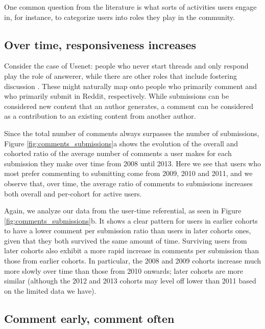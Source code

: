 One common question from the literature is what sorts of activities users engage in, for instance, to categorize users into roles they play in the community\cite{Welser2011}.

\subsection{Over time, responsiveness increases}
Consider the case of Usenet: people who never start threads and only respond play the role of answerer, while there are other roles that include fostering discussion \cite{Welser2007}. These might naturally map onto people who primarily comment and who primarily submit in Reddit, respectively.  While submissions can be considered new content that an author generates, a comment can be considered as a contribution to an existing content from another author.

Since the total number of comments always surpasses the number of submissions, Figure \ref{fig:comments_submissions}a shows the evolution of the overall and cohorted ratio of the average number of comments a user makes for each submission they make over time from 2008 until 2013. Here we see that users who most prefer commenting to submitting come from 2009, 2010 and 2011, and we observe that, over time, the average ratio of comments to submissions increases both overall and per-cohort for active users.

Again, we analyze our data from the user-time referential, as seen in Figure \ref{fig:comments_submissions}b. It shows a clear pattern for users in earlier cohorts to have a lower comment per submission ratio than users in later cohorts ones, given that they both survived the same amount of time.  Surviving users from later cohorts also exhibit a more rapid increase in comments per submission than those from earlier cohorts.  In particular, the 2008 and 2009 cohorts increase much more slowly over time than those from 2010 onwards; later cohorts are more similar (although the 2012 and 2013 cohorts may level off lower than 2011 based on the limited data we have). 

\subsection{Comment early, comment often}

